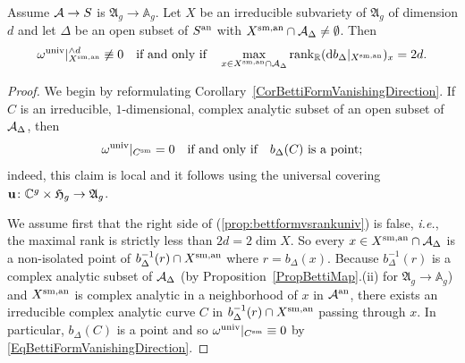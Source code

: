 \begin{proposition}\label{PropBettiFormNonDegUnivAb} 
Assume $\mathcal{A} \rightarrow S$ is $\mathfrak{A}_g \rightarrow \mathbb A_g$. Let $X$ be an irreducible subvariety of $\mathfrak{A}_g$ of dimension
$d$ and let $\Delta$ be an open subset of ${S}^{\mathrm{an}}$ with ${X}^{\mathrm{sm,an}}\cap\mathcal{A}_\Delta\not=\emptyset$. Then
\begin{equation}
\label{prop:bettformvsrankuniv}
 \omega^{\mathrm{univ}}|_{{X}^{\mathrm{sm,an}}}^{\wedge d} \not\equiv 0
\quad\text{if and only if}\quad
\max_{x \in {X}^{\mathrm{sm,an}}\cap\mathcal{A}_\Delta} \mathrm{rank}_{{\mathbb{R}}} (\mathrm{d}b_\Delta|_{{X}^{\mathrm{sm,an}}})_{x} = 2d.
\end{equation}
\end{proposition}
\begin{proof}
We begin by  reformulating
Corollary~\ref{CorBettiFormVanishingDirection}.
If ${C}$ is an irreducible, $1$-dimensional, complex analytic subset
of an open subset of ${\mathcal{A}_\Delta}$, then
\begin{equation}\label{EqBettiFormVanishingDirection}
{\omega}^{\mathrm{univ}}|_{{C}^{\mathrm{sm}}} = 0 \quad\text{if
and only if}\quad b_\Delta({C})\text{ is a point};
\end{equation}
indeed, this claim is local and it follows using the universal
covering
$\mathbf{u} \colon {\mathbb{C}}^g\times\mathfrak{H}_g \rightarrow \mathfrak{A}_g$. 

We assume first that the right side of (\ref{prop:bettformvsrankuniv})
is false, \textit{i.e.}, the maximal rank is strictly less than
$2d=2\dim X$.
So  every $x\in {X}^{\mathrm{sm,an}}\cap\mathcal{A}_\Delta$  is a non-isolated point of  
$b_\Delta^{-1}(r) \cap {X}^{\mathrm{sm,an}}$  where $r =
b_\Delta(x)$. Because 
$b_\Delta^{-1}(r)$ is a complex analytic subset of $\mathcal{A}_\Delta$ (by Proposition~\ref{PropBettiMap}.(ii) for $\mathfrak{A}_g \rightarrow \mathbb{A}_g$) and ${X}^{\mathrm{sm,an}}$ is complex
analytic in a neighborhood of $x$ in ${\mathcal{A}}^{\mathrm{an}}$, there exists  an irreducible
complex analytic curve ${C}$ in  $b_\Delta^{-1}(r) \cap {X}^{\mathrm{sm,an}}$ passing
through $x$. In
particular, $b_\Delta({C})$ is a point
and so ${\omega}^{\mathrm{univ}}|_{{C}^{\mathrm{sm}}} \equiv 0$ by \eqref{EqBettiFormVanishingDirection}.


\end{proof}
